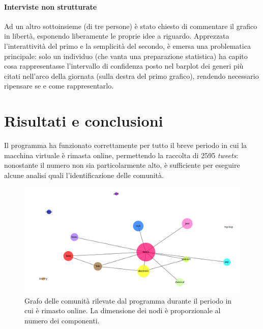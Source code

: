\documentclass[12pt, a4paper, twocolumn]{article} %
\begin{document}
\subsection{Interviste non strutturate}
Ad un altro sottoinsieme (di tre persone) è stato chiesto di commentare il grafico in libertà, esponendo liberamente le proprie idee a riguardo.
Apprezzata l'interattività del primo e la semplicità del secondo, è emersa una problematica principale: solo un individuo (che vanta una preparazione statistica) ha capito cosa rappresentasse l'intervallo di confidenza posto nel barplot dei generi più citati nell'arco della giornata (sulla destra del primo grafico), rendendo necessario ripensare se e come rappresentarlo.

\hfill
\newpage
\part{Risultati e conclusioni}
Il programma ha funzionato correttamente per tutto il breve periodo in cui la macchina virtuale è rimasta online, permettendo la raccolta di 2595 \textit{tweets}: nonostante il numero non sia particolarmente alto, è sufficiente per eseguire alcune analisi quali l'identificazione delle comunità.

\begin{figure}[h!]
  \centering
  \includegraphics[width=\textwidth]{grafo.png}
  \caption{Grafo delle comunità rilevate dal programma durante il periodo in cui è rimasto online. La dimensione dei nodi è proporzionale al numero dei componenti.}
\end{figure}
\end{document}
